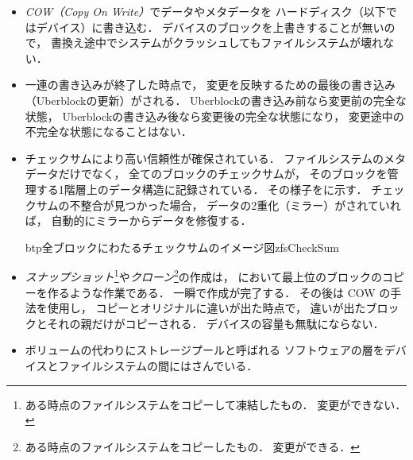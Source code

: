 \begin{itemize}
\item \emph{COW（Copy On Write）}でデータやメタデータを
  ハードディスク（以下ではデバイス）に書き込む．
  デバイスのブロックを上書きすることが無いので，
  書換え途中でシステムがクラッシュしてもファイルシステムが壊れない．
\item 一連の書き込みが終了した時点で，
  変更を反映するための最後の書き込み（Uberblockの更新）がされる．
  Uberblockの書き込み前なら変更前の完全な状態，
  Uberblockの書き込み後なら変更後の完全な状態になり，
  変更途中の不完全な状態になることはない．
\item チェックサムにより高い信頼性が確保されている．
  ファイルシステムのメタデータだけでなく，
  全てのブロックのチェックサムが，
  そのブロックを管理する1階層上のデータ構造に記録されている．
  その様子をに示す．
  チェックサムの不整合が見つかった場合，
  データの2重化（ミラー）がされていれば，
  自動的にミラーからデータを修復する．
  \begin{myfig}{btp}{全ブロックにわたるチェックサムのイメージ図}{zfsCheckSum}
  \end{myfig}
\item \emph{スナップショット}\footnote{
    ある時点のファイルシステムをコピーして凍結したもの．
    変更ができない．
  }や\emph{クローン}\footnote{
    ある時点のファイルシステムをコピーしたもの．
    変更ができる．
  }の作成は，
  において最上位のブロックのコピーを作るような作業である．
  一瞬で作成が完了する．
  その後は COW の手法を使用し，
  コピーとオリジナルに違いが出た時点で，
  違いが出たブロックとそれの親だけがコピーされる．
  デバイスの容量も無駄にならない．
\item ボリュームの代わりにストレージプールと呼ばれる
  ソフトウェアの層をデバイスとファイルシステムの間にはさんでいる．

\end{itemize}
